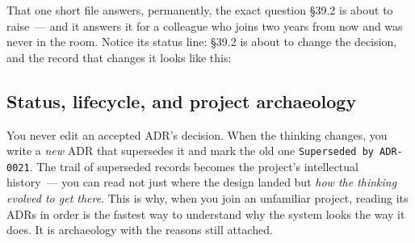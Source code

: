 \noindent{}That one short file answers, permanently, the exact question §39.2 is about to raise~--- and it answers it for a colleague who joins two years from now and was never in the room. Notice its status line: §39.2 is about to change the decision, and the record that changes it looks like this:

\begin{codebox}

\begin{Shaded}
\begin{Highlighting}[]







\SpecialStringTok{+ }
\SpecialStringTok{+ }
\SpecialStringTok{{-} }
\end{Highlighting}
\end{Shaded}

\end{codebox}

\subsection*{Status, lifecycle, and project archaeology}\label{39-local-vs-production:status-lifecycle-and-project-archaeology}

You never edit an accepted ADR's decision. When the thinking changes, you write a \emph{new} ADR that supersedes it and mark the old one \texttt{Superseded\ by\ ADR-0021}. The trail of superseded records becomes the project's intellectual history~--- you can read not just where the design landed but \emph{how the thinking evolved to get there}. This is why, when you join an unfamiliar project, reading its ADRs in order is the fastest way to understand why the system looks the way it does. It is archaeology with the reasons still attached.

